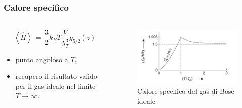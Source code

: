 \begin{frame}
  \frametitle{Calore specifico}
  \framesubtitle{}

  \begin{columns}
      \begin{column}{0.5\textwidth}
        $$
        \left<\hat{H}\right>\,=\,\frac{3}{2}k_B T\frac{V}{\lambda_T^3}g_{5/2}\left(z\right)
        $$
        \vspace{12pt}
        \begin{itemize}[itemsep=0.5em, label=$\bullet$]
          \item punto angoloso a $T_c$
          \item recupero il risultato valido per il gas ideale nel limite $T \rightarrow \infty$.
        \end{itemize}
      \end{column}
      
      \begin{column}{0.5\textwidth}
        \begin{figure}
            \includegraphics[width=\textwidth]{Immagini/calSpe.png}
            \caption{Calore specifico del gas di Bose ideale}
        \end{figure}
      \end{column}
    \end{columns}

\end{frame}